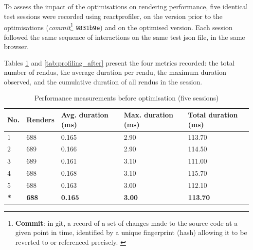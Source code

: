 To assess the impact of the optimisations on rendering performance, five identical test sessions were recorded using \gls{reactprofiler}, on the version prior to the optimisations (\textit{commit}\footnote{\textbf{Commit}: in \gls{git}, a record of a set of changes made to the source code at a given point in time, identified by a unique fingerprint (hash) allowing it to be reverted to or referenced precisely. \parencite{noauthor_git_nodate}} \texttt{9831b9e}) and on the optimised version. Each session followed the same sequence of interactions on the same test \gls{json} file, in the same browser.

\clearpage

Tables \ref{tab:profiling_before} and \ref{tab:profiling_after} present the four metrics recorded: the total number of \glspl{rendu}, the average duration per \gls{rendu}, the maximum duration observed, and the cumulative duration of all \glspl{rendu} in the session.

\begin{table}[H]
    \centering
    \caption{Performance measurements before optimisation (five sessions)}
    \renewcommand{\arraystretch}{1.5}
    \begin{tabular}{p{0.8cm} p{2.5cm} p{3cm} p{3cm} p{3cm}}
        \hline
        \textbf{No.} & \textbf{Renders} & \textbf{Avg. duration (ms)} & \textbf{Max. duration (ms)} & \textbf{Total duration (ms)} \\
        \hline
        1 & 688 & 0.165 & 2.90 & 113.70 \\
        2 & 689 & 0.166 & 2.90 & 114.50 \\
        3 & 689 & 0.161 & 3.10 & 111.00 \\
        4 & 688 & 0.168 & 3.10 & 115.70 \\
        5 & 688 & 0.163 & 3.00 & 112.10 \\
        \hline
        \textbf{*} & \textbf{688} & \textbf{0.165} & \textbf{3.00} & \textbf{113.70} \\
        \hline
    \end{tabular}
    \par{}
    \label{tab:profiling_before}
\end{table}

